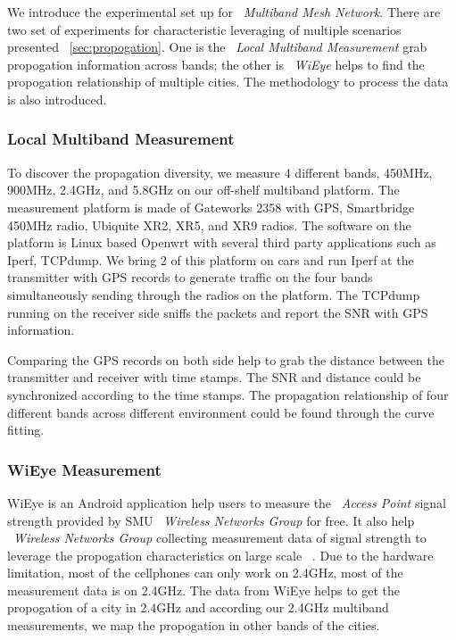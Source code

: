 We introduce the experimental set up for ~\emph{Multiband Mesh Network}. There are two set of experiments for characteristic leveraging of multiple scenarios presented ~\ref{sec:propogation}. 
One is the ~\emph{Local Multiband Measurement} grab propogation information across bands; the other is ~\emph{WiEye} helps to find the propogation relationship of multiple cities. The methodology to process the data is also introduced.

\subsubsection{Local Multiband Measurement}
To discover the propagation diversity, we measure 4 different bands, 450MHz, 900MHz, 2.4GHz, and 5.8GHz on our off-shelf multiband platform. 
The measurement platform is made of Gateworks 2358 with GPS, Smartbridge 450MHz radio, Ubiquite XR2, XR5, and XR9 radios. 
The software on the platform is Linux based Openwrt with several third party applications such as Iperf, TCPdump.
We bring 2 of this platform on cars and run Iperf at the transmitter with GPS records to generate traffic on the four bands simultaneously sending through the radios on the platform.
The TCPdump running on the receiver side sniffs the packets and report the SNR with GPS information.


Comparing the GPS records on both side help to grab the distance between the transmitter and receiver with time stamps. The SNR and distance could be synchronized according to the time stamps.
The propagation relationship of four different bands across different environment could be found through the curve fitting. 

\subsubsection{WiEye Measurement}
WiEye is an Android application help users to measure the ~\emph{Access Point} signal strength provided by SMU ~\emph{Wireless Networks Group} for free. It also help ~\emph{Wireless Networks Group} collecting measurement data of signal strength to leverage the propogation characteristics on large scale ~\cite{meikle2012global}.
Due to the hardware limitation, most of the cellphones can only work on 2.4GHz, most of the measurement data is on 2.4GHz. 
The data from WiEye helps to get the propogation of a city in 2.4GHz and according our 2.4GHz multiband measurements, we map the propogation in other bands of the cities. 


